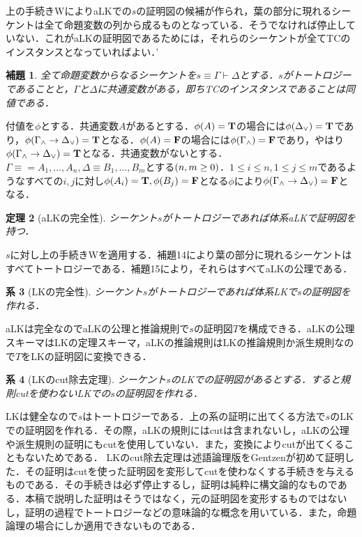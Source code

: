 \documentclass{ltjsarticle}
\makeatletter
\theoremstyle{mystyle1}
\theoremstyle{mystyle3}
\newtheorem{cor}{系}
\newtheorem{lem}[cor]{補題}
\newtheorem{thm}[cor]{定理}
\theoremstyle{mystyle2}
\renewenvironment{proof}[1][\proofname]{\par
  \pushQED{\qed}%
  \normalfont
  \topsep6\p@\@plus6\p@ \trivlist
  \item[\hskip\labelsep{\bfseries\sffamily #1}]\ignorespaces
}{%
  \popQED\endtrivlist\@endpefalse
}
\renewcommand\proofname{証明:}
\newcommand{\bT}{\ensuremath{\mathbf{T}}}
\newcommand{\bF}{\ensuremath{\mathbf{F}}}
\makeatother
\begin{document}
上の手続きWによりaLKでの$s$の証明図の候補が作られ，葉の部分に現れるシーケントは全て命題変数の列から成るものとなっている．そうでなければ停止していない．これがaLKの証明図であるためには，それらのシーケントが全てTCのインスタンスとなっていればよい．'
\begin{lem}
  全て命題変数からなるシーケントを$s\equiv\Gamma\vdash\Delta$とする．$s$がトートロジーであることと，$\Gamma$と$\Delta$に共通変数がある，即ちTCのインスタンスであることは同値である．
\end{lem}
\begin{proof}
  付値を$\phi$とする．共通変数$A$があるとする．$\phi\qty(A) = \bT$の場合には$\phi\qty(\Delta_\vee) = \bT$であり，$\phi\qty(\Gamma_\wedge\to\Delta_\vee) = \bT$となる．$\phi\qty(A) = \bF$の場合には$\phi\qty(\Gamma_\wedge) = \bF$であり，やはり$\phi\qty(\Gamma_\wedge\to\Delta_\vee) = \bT$となる．共通変数がないとする．$\Gamma\equiv= A_1,\ldots, A_n, \Delta\equiv B_1,\ldots, B_m$とする$\qty(n, m \geq 0)$．$1\leq i\leq n,1\leq j\leq m$であるようなすべての$i,j$に対し$\phi\qty(A_i) = \bT, \phi\qty(B_j) = \bF$となる$\phi$により$\phi\qty(\Gamma_\wedge\to\Delta_\vee) = \bF$となる．
\end{proof}
\begin{thm}[aLKの完全性]
  シーケント$s$がトートロジーであれば体系aLKで証明図を持つ．
\end{thm}
\begin{proof}
  $s$に対し上の手続きWを適用する．補題14により葉の部分に現れるシーケントはすべてトートロジーである．補題15により，それらはすべてaLKの公理である．
\end{proof}
\begin{cor}[LKの完全性]
  シーケント$s$がトートロジーであれば体系LKで$s$の証明図を作れる．
\end{cor}
\begin{proof}
  aLKは完全なのでaLKの公理と推論規則で$s$の証明図$T$を構成できる．aLKの公理スキーマはLKの定理スキーマ，aLKの推論規則はLKの推論規則か派生規則なので$T$をLKの証明図に変換できる．
\end{proof}
\begin{cor}[LKのcut除去定理]
  シーケント$s$のLKでの証明図があるとする．すると規則cutを使わないLKでの$s$の証明図を作れる．
\end{cor}
\begin{proof}
  LKは健全なので$s$はトートロジーである．上の系の証明に出てくる方法で$s$のLKでの証明図を作れる．その際，aLKの規則にはcutは含まれないし，aLKの公理や派生規則の証明にもcutを使用していない．また，変換によりcutが出てくることもないためである．
\end{proof}
LKのcut除去定理は述語論理版をGentzenが初めて証明した．その証明はcutを使った証明図を変形してcutを使わなくする手続きを与えるものである．その手続きは必ず停止するし，証明は純粋に構文論的なものである．本稿で説明した証明はそうではなく，元の証明図を変形するものではないし，証明の過程でトートロジーなどの意味論的な概念を用いている．また，命題論理の場合にしか適用できないものである．
\end{document}
